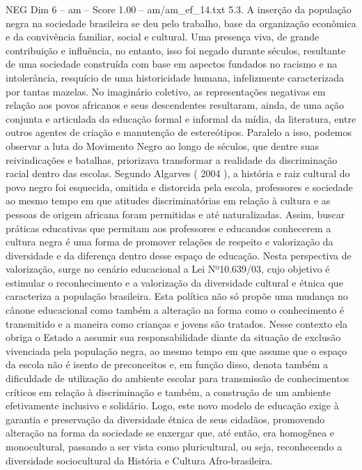 \begin{textsample}{NEG Dim 6 – am – Score 1.00 – am/am\_ef\_14.txt}  \label{ex:f6_neg_022}
5.3.
A inserção da população negra na sociedade brasileira se deu pelo trabalho, base da organização econômica e da convivência familiar, social e cultural.
Uma presença viva, de grande contribuição e influência, no entanto, isso foi negado durante séculos, resultante de uma sociedade construída com base em aspectos fundados no racismo e na intolerância, resquício de uma historicidade humana, infelizmente caracterizada por tantas mazelas.
No imaginário coletivo, as representações negativas em relação aos povos africanos e seus descendentes resultaram, ainda, de uma ação conjunta e articulada da educação formal e informal da mídia, da literatura, entre outros agentes de criação e manutenção de estereótipos.
Paralelo a isso, podemos observar a luta do Movimento Negro ao longo de séculos, que dentre suas reivindicações e batalhas, priorizava transformar a realidade da discriminação racial dentro das escolas.
Segundo Algarves ( 2004 ), a história e raiz cultural do povo negro foi esquecida, omitida e distorcida pela escola, professores e sociedade ao mesmo tempo em que atitudes discriminatórias em relação à cultura e as pessoas de origem africana foram permitidas e até naturalizadas.
Assim, buscar práticas educativas que permitam aos professores e educandos conhecerem a cultura negra é uma forma de promover relações de respeito e valorização da diversidade e da diferença dentro desse espaço de educação.
Nesta perspectiva de valorização, surge no cenário educacional a Lei Nº10.639/03, cujo objetivo é estimular o reconhecimento e a valorização da diversidade cultural e étnica que caracteriza a população brasileira.
Esta política não só propõe uma mudança no cânone educacional como também a alteração na forma como o conhecimento é transmitido e a maneira como crianças e jovens são tratados.
Nesse contexto ela obriga o Estado a assumir sua responsabilidade diante da situação de exclusão vivenciada pela população negra, ao mesmo tempo em que assume que o espaço da escola não é isento de preconceitos e, em função disso, denota também a dificuldade de utilização do ambiente escolar para transmissão de conhecimentos críticos em relação à discriminação e também, a construção de um ambiente efetivamente inclusivo e solidário.
Logo, este novo modelo de educação exige à garantia e preservação da diversidade étnica de seus cidadãos, promovendo alteração na forma da sociedade se enxergar que, até então, era homogênea e monocultural, passando a ser vista como pluricultural, ou seja, reconhecendo a diversidade sociocultural da História e Cultura Afro-brasileira.

\end{textsample}
